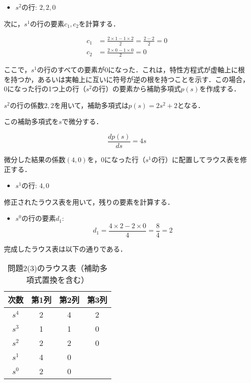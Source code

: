 \documentclass[11pt,a4paper]{ltjsarticle}
\begin{document}
\begin{itemize}
\item $s^2$の行: $2, 2, 0$
\end{itemize}

次に，$s^1$の行の要素$c_1, c_2$を計算する．

\begin{align}
c_1 &= \frac{2 \times 1 - 1 \times 2}{2} = \frac{2-2}{2} = 0 \\
c_2 &= \frac{2 \times 0 - 1 \times 0}{2} = 0
\end{align}

ここで，$s^1$の行のすべての要素が0になった．これは，特性方程式が虚軸上に根を持つか，あるいは実軸上に互いに符号が逆の根を持つことを示す．この場合，0になった行の1つ上の行（$s^2$の行）の要素から補助多項式$p(s)$を作成する．

$s^2$の行の係数$2, 2$を用いて，補助多項式は$p(s) = 2s^2 + 2$となる．

この補助多項式を$s$で微分する．

\begin{equation}
\frac{dp(s)}{ds} = 4s
\end{equation}

微分した結果の係数$(4, 0)$を，0になった行（$s^1$の行）に配置してラウス表を修正する．

\begin{itemize}
\item $s^1$の行: $4, 0$
\end{itemize}

修正されたラウス表を用いて，残りの要素を計算する．

\begin{itemize}
\item $s^0$の行の要素$d_1$:
  \begin{equation}
  d_1 = \frac{4 \times 2 - 2 \times 0}{4} = \frac{8}{4} = 2
  \end{equation}
\end{itemize}

完成したラウス表は以下の通りである．

\begin{table}[h]
\centering
\caption{問題2(3)のラウス表（補助多項式置換を含む）}
\label{tbl:routh3}
\begin{tabular}{cccc}
\toprule
次数 & 第1列 & 第2列 & 第3列 \\
\midrule
$s^4$ & 2 & 4 & 2 \\
$s^3$ & 1 & 1 & 0 \\
$s^2$ & 2 & 2 & 0 \\
$s^1$ & 4 & 0 & \\
$s^0$ & 2 & 0 & \\
\bottomrule
\end{tabular}
\end{table}
\end{document}
